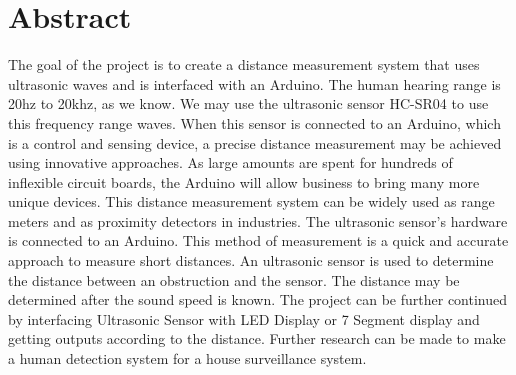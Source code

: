 \chapter*{\HUGE \center Abstract}


\LARGE The goal of the project is to create a distance measurement system that uses ultrasonic waves and is interfaced with an Arduino. The human hearing range is 20hz to 20khz, as we know. We may use the ultrasonic sensor HC-SR04 to use this frequency range waves. When this sensor is connected to an Arduino, which is a control and sensing device, a precise distance measurement may be achieved using innovative approaches. As large amounts are spent for hundreds of inflexible circuit boards, the Arduino will allow business to bring many more unique devices. This distance measurement system can be widely used as range meters and as proximity detectors in industries.  The ultrasonic sensor's hardware is connected to an Arduino. This method of measurement is a quick and accurate approach to measure short distances. An ultrasonic sensor is used to determine the distance between an obstruction and the sensor. The distance may be determined after the sound speed is known.  The project can be further continued by interfacing Ultrasonic Sensor with LED Display or 7 Segment display and getting outputs according to the distance. Further research can be made to make a human detection system for a house surveillance system.


